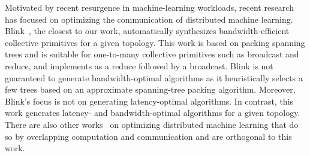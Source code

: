 Motivated by recent resurgence in machine-learning workloads, recent research has focused on optimizing the communication of distributed machine learning. Blink~\cite{wang2020blink}, the closest to our work, automatically synthesizes bandwidth-efficient collective primitives for a given topology. This work is based on packing spanning trees and is suitable for one-to-many collective primitives such as broadcast and reduce, and implements \allreduce as a reduce followed by a broadcast. Blink is not guaranteed to generate bandwidth-optimal algorithms as it heuristically selects a few trees based on an approximate spanning-tree packing algorithm. Moreover, Blink's focus is not on generating latency-optimal algorithms. In contrast, this work generates latency- and bandwidth-optimal algorithms for a given topology. There are also other works~\cite{zhang2017poseidon,hashemi2019tictac,jayarajan2019priority,peng2019generic} on optimizing distributed machine learning that do so by overlapping computation and communication and are orthogonal to this work. 



